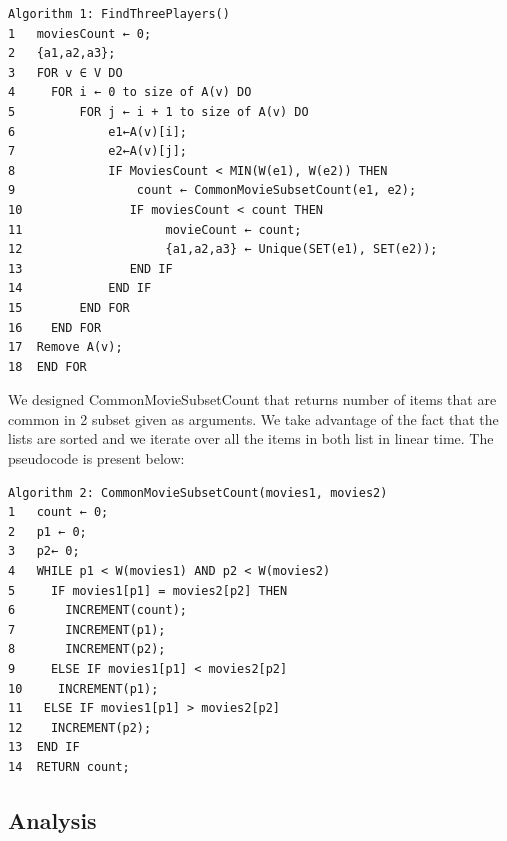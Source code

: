 \begin{verbatim}
Algorithm 1: FindThreePlayers()
1	moviesCount ← 0;
2	{a1,a2,a3};
3	FOR v ∈ V DO
4	  FOR i ← 0 to size of A(v) DO
5	      FOR j ← i + 1 to size of A(v) DO
6	          e1←A(v)[i];
7	          e2←A(v)[j];
8	          IF MoviesCount < MIN(W(e1), W(e2)) THEN
9	              count ← CommonMovieSubsetCount(e1, e2);
10	             IF moviesCount < count THEN
11	                  movieCount ← count;
12	                  {a1,a2,a3} ← Unique(SET(e1), SET(e2));
13	             END IF
14	          END IF
15	      END FOR
16	  END FOR
17	Remove A(v);
18	END FOR	  	                    	  
\end{verbatim}

We designed CommonMovieSubsetCount that returns number of items that are common in 2 subset given as arguments. We take advantage of the fact that the lists are sorted and we iterate over all the items in both list in linear time. The pseudocode is present below:

\begin{verbatim}
Algorithm 2: CommonMovieSubsetCount(movies1, movies2)
1	count ← 0;
2	p1 ← 0;
3	p2← 0;
4	WHILE p1 < W(movies1) AND p2 < W(movies2)
5	  IF movies1[p1] = movies2[p2] THEN
6	    INCREMENT(count);
7	    INCREMENT(p1);
8	    INCREMENT(p2);
9	  ELSE IF movies1[p1] < movies2[p2]
10	   INCREMENT(p1);
11	 ELSE IF movies1[p1] > movies2[p2]
12	  INCREMENT(p2);
13	END IF
14	RETURN count;
\end{verbatim}

\subsection{Analysis}

